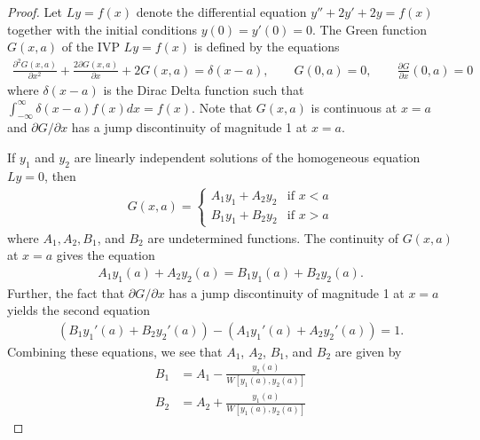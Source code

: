 \documentclass[12pt]{article}
\theoremstyle{definition}
\begin{document}
\begin{proof}
  Let $Ly = f(x)$ denote the differential equation $y'' + 2y' + 2y = f(x)$ together with the
  initial conditions $y(0) = y'(0) = 0$.
  The Green function $G(x, a)$ of the IVP $Ly = f(x)$ is defined by the equations
  \begin{align*}
    \frac{\partial^2 G(x, a)}{\partial x^2} + \frac{2\partial G(x, a)}{\partial x} + 2G(x, a) = \delta(x- a), \qquad G(0, a) = 0, \qquad \frac{\partial G}{\partial x}(0, a) = 0
  \end{align*}
  where $\delta(x-a)$ is the Dirac Delta function such that
  $\int_{-\infty}^{\infty} \delta(x-a)f(x) dx = f(x)$. Note that $G(x, a)$ is continuous
  at $x=a$ and $\partial G /\partial x$ has a jump discontinuity of magnitude 1 at $x=a$.

  If $y_1$ and $y_2$ are linearly independent solutions of the homogeneous equation $Ly = 0$,
  then
  \begin{align*}
    G(x, a) =
    \begin{cases}
      A_1 y_1 + A_2 y_2 & \text{if $x < a$} \\
      B_1 y_1 + B_2 y_2 & \text{if $x > a$}
    \end{cases}
  \end{align*}
  where $A_1, A_2, B_1$, and $B_2$ are undetermined functions.
  The continuity of $G(x, a)$ at $x = a$ gives the equation
  \begin{align*}
    A_1 y_1(a) + A_2 y_2(a) = B_1 y_1(a) + B_2 y_2(a).
  \end{align*}
  Further, the fact that  $\partial G /\partial x$ has a jump discontinuity of magnitude 1 at $x=a$
  yields the second equation
  \begin{align*}
    (B_1 y_1'(a) + B_2 y_2'(a)) - (A_1 y_1'(a) + A_2 y_2'(a)) = 1.
  \end{align*}
  Combining these equations, we see that $A_1$, $A_2$, $B_1$, and $B_2$ are
  given by
  \begin{align*}
    B_1 &= A_1 - \frac{y_2(a)}{W[y_1(a),y_2(a)]} \\
    B_2 &= A_2 + \frac{y_1(a)}{W[y_1(a),y_2(a)]}
  \end{align*}


\end{proof}
\end{document}
